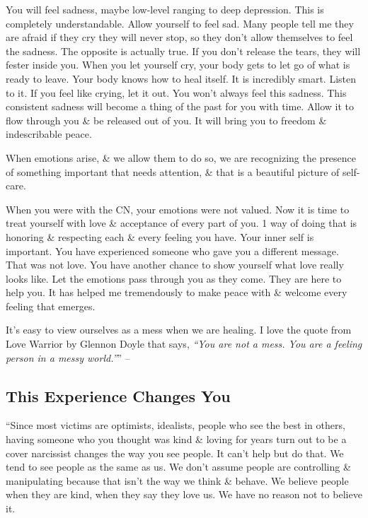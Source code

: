 \documentclass{article}
\numberwithin{equation}{section}
\begin{document}
You will feel sadness, maybe low-level ranging to deep depression. This is completely understandable. Allow yourself to feel sad. Many people tell me they are afraid if they cry they will never stop, so they don't allow themselves to feel the sadness. The opposite is actually true. If you don't release the tears, they will fester inside you. When you let yourself cry, your body gets to let go of what is ready to leave. Your body knows how to heal itself. It is incredibly smart. Listen to it. If you feel like crying, let it out. You won't always feel this sadness. This consistent sadness will become a thing of the past for you with time. Allow it to flow through you \& be released out of you. It will bring you to freedom \& indescribable peace.

When emotions arise, \& we allow them to do so, we are recognizing the presence of something important that needs attention, \& that is a beautiful picture of self-care.

When you were with the CN, your emotions were not valued. Now it is time to treat yourself with love \& acceptance of every part of you. 1 way of doing that is honoring \& respecting each \& every feeling you have. Your inner self is important. You have experienced someone who gave you a different message. That was not love. You have another chance to show yourself what love really looks like. Let the emotions pass through you as they come. They are here to help you. It has helped me tremendously to make peace with \& welcome every feeling that emerges.

It's easy to view ourselves as a mess when we are healing. I love the quote from Love Warrior by Glennon Doyle that says, \textit{``You are not a mess. You are a feeling person in a messy world.''}'' -- \cite[pp. 162--163]{Mirza2017}

\subsection{This Experience Changes You}
``Since most victims are optimists, idealists, people who see the best in others, having someone who you thought was kind \& loving for years turn out to be a cover narcissist changes the way you see people. It can't help but do that. We tend to see people as the same as us. We don't assume people are controlling \& manipulating because that isn't the way we think \& behave. We believe people when they are kind, when they say they love us. We have no reason not to believe it.
\end{document}
